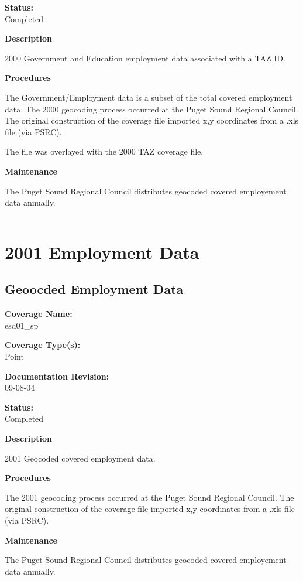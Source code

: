 {\bf \large Status:}\\
Completed

{\bf \large Description}

2000 Government and Education employment data associated with a
TAZ ID.

{\bf \large Procedures}

The Government/Employment data is a subset of the total covered
employment data. The 2000 geocoding process occurred at the Puget
Sound Regional Council. The original construction of the coverage
file imported x,y coordinates from a .xls file (via PSRC).

The file was overlayed with the 2000 TAZ coverage file.

{\bf \large Maintenance}

The Puget Sound Regional Council distributes geocoded covered
employement data annually.

\begin{landscape}
\begin{longtable}{llrrrrrc}

\end{longtable}
\end{landscape}
\newpage

\section{2001 Employment Data}
\subsection{Geoocded Employment Data}
{\bf \large Coverage Name:}\\
esd01\_sp

{\bf \large Coverage Type(s):}\\
Point

{\bf \large Documentation Revision:}\\
09-08-04

{\bf \large Status:}\\
Completed

{\bf \large Description}

2001 Geocoded covered employment data.

{\bf \large Procedures}

The 2001 geocoding process occurred at the Puget Sound Regional
Council. The original construction of the coverage file imported
x,y coordinates from a .xls file (via PSRC).

{\bf \large Maintenance}

The Puget Sound Regional Council distributes geocoded covered
employement data annually.

\begin{landscape}
\begin{longtable}{llrrrrrc}

\end{longtable}
\end{landscape}
\newpage
